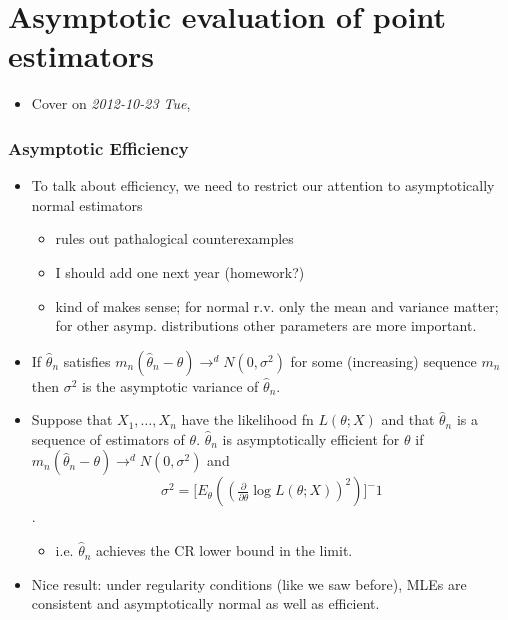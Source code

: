 
\part*{Asymptotic evaluation of point estimators}%

\begin{itemize}
\item Cover on \textit{2012-10-23 Tue},
\end{itemize}
\section{Asymptotic Efficiency}
\label{sec-1}

\begin{itemize}
\item To talk about efficiency, we need to restrict our attention to
      asymptotically normal estimators
\begin{itemize}
\item rules out pathalogical counterexamples
\item I should add one next year (homework?)
\item kind of makes sense; for normal r.v. only the mean and
        variance matter; for other asymp. distributions other
        parameters are more important.
\end{itemize}
\item If $\hat\theta_n$ satisfies $m_n (\hat\theta_n - \theta) \to^d
      N(0, \sigma^2)$ for some (increasing) sequence $m_n$ then
      $\sigma^2$ is the asymptotic variance of $\hat\theta_n$.
\item Suppose that $X_1,\dots,X_n$ have the likelihood fn $L(\theta;
      X)$ and that $\hat\theta_n$ is a sequence of estimators of
      $\theta$.  $\hat\theta_n$ is asymptotically efficient for
      $\theta$ if $m_n (\hat\theta_n - \theta) \to^d N(0, \sigma^2)$
      and 
      \[\sigma^2 = \Big[E_\theta ((\tfrac{\partial}{\partial \theta} \log L(\theta; X))^2)\big]^-1\].
\begin{itemize}
\item i.e. $\hat\theta_n$ achieves the CR lower bound in the limit.
\end{itemize}
\item Nice result: under regularity conditions (like we saw before),
      MLEs are consistent and asymptotically normal as well as
      efficient.
\end{itemize}